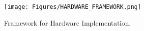 \begin{figure}[!ht]
	\centering
	\texttt{[image: Figures/HARDWARE\_FRAMEWORK.png]}
	\caption[]{Framework for Hardware Implementation.}
	\label{fig:hardframe}
\end{figure}





